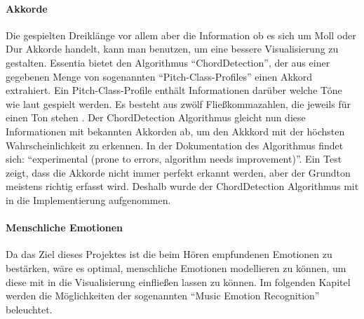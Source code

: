 \documentclass[11pt,a4paper]{article}
\begin{document}
\paragraph{Akkorde}
Die gespielten Dreiklänge vor allem aber die Information ob es sich um Moll oder Dur Akkorde handelt, kann man benutzen, um eine bessere Visualisierung zu gestalten. Essentia bietet den Algorithmus ``ChordDetection'', der aus einer gegebenen Menge von sogenannten ``Pitch-Class-Profiles'' einen Akkord extrahiert. Ein Pitch-Class-Profile enthält Informationen darüber welche Töne wie laut gespielt werden. Es besteht aus zwölf Fließkommazahlen, die jeweils für einen Ton stehen \cite{e6fe2ea94b8d448139e05e3d36c0ffd5e82905dc87f719492ff3872650c667d9}. Der ChordDetection Algorithmus gleicht nun diese Informationen mit bekannten Akkorden ab, um den Akkkord mit der höchsten Wahrscheinlichkeit zu erkennen. In der Dokumentation des Algorithmus findet sich: ``experimental (prone to errors, algorithm needs improvement)''\cite{EssentiaChordDetection}. Ein Test zeigt, dass die Akkorde nicht immer perfekt erkannt werden, aber der Grundton meistens richtig erfasst wird. Deshalb wurde der ChordDetection Algorithmus mit in die Implementierung aufgenommen.

\paragraph{Menschliche Emotionen}
Da das Ziel dieses Projektes ist die beim Hören empfundenen Emotionen zu bestärken, wäre es optimal, menschliche Emotionen modellieren zu können, um diese mit in die Visualisierung einfließen lassen zu können. Im folgenden Kapitel werden die Möglichkeiten der sogenannten ``Music Emotion Recognition'' beleuchtet.

\newpage
\end{document}
